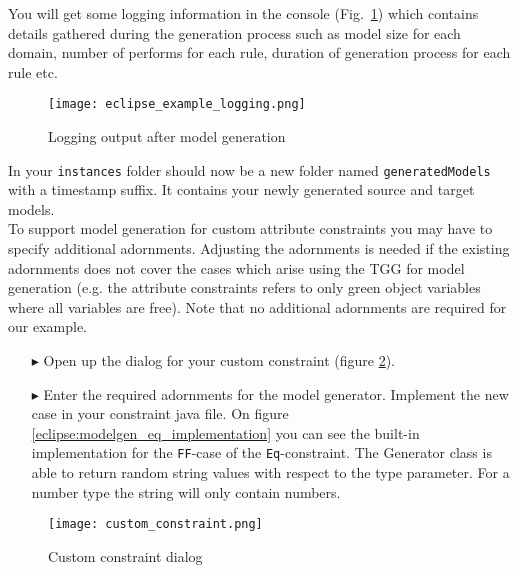 You will get some logging information in the console (Fig.~\ref{eclipse:modelgen_log}) which contains
details gathered during the generation process such as model size for each domain, number of performs for
each rule, duration of generation process for each rule etc.


\begin{figure}[htbp]
\renewcommand\figurename{Figure} 
\begin{center}
\texttt{[image: eclipse\_example\_logging.png]}
\caption{Logging output after model generation}
\label{eclipse:modelgen_log}
\end{center}
\end{figure}

In your \texttt{instances} folder should now be a new folder named
\texttt{generated\-Models} with a timestamp suffix. It contains your newly generated
source and target models. \\



To support model generation for custom attribute constraints you may have to specify additional adornments. 
Adjusting the adornments is needed if the existing adornments does not cover the cases 
which arise using the TGG for model generation (e.g. the attribute constraints refers to only green object variables where all variables are free). 
Note that no additional adornments are required for our example.
\begin{itemize}

\item[$\blacktriangleright$] Open up the dialog for your custom constraint (figure \ref{fig:custom_constraint_definition}).

\item[$\blacktriangleright$] Enter the required adornments for the model
generator. Implement the new case in your constraint java
file. On figure \ref{eclipse:modelgen_eq_implementation} you can see the built-in implementation for the
\texttt{FF}-case of the \texttt{Eq}-constraint. The Generator class is able to
return random string values with respect to the type parameter. For a number
type the string will only contain numbers.

\end{itemize}

\begin{figure}[hbt] 
\centering 
\texttt{[image: custom\_constraint.png]}
\caption{Custom constraint dialog}
\label{fig:custom_constraint_definition}
\end{figure}
 


